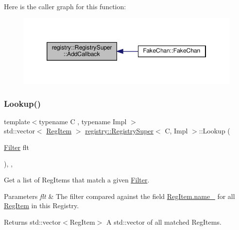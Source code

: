 Here is the caller graph for this function\+:
\nopagebreak
\begin{figure}[H]
\begin{center}
\leavevmode
\includegraphics[width=346pt]{classregistry_1_1RegistrySuper_a80e234502449509e0c9ce75e787ef974_icgraph}
\end{center}
\end{figure}
\mbox{\label{classregistry_1_1RegistrySuper_a83240eacc385688b32998c1e83d086c5}} 
\subsubsection{\texorpdfstring{Lookup()}{Lookup()}}
{\footnotesize\ttfamily template$<$typename C , typename Impl $>$ \\
std\+::vector$<$ \hyperlink{classregistry_1_1RegItem}{Reg\+Item} $>$ \hyperlink{classregistry_1_1RegistrySuper}{registry\+::\+Registry\+Super}$<$ C, Impl $>$\+::Lookup (\begin{DoxyParamCaption}\item[{\hyperlink{classregistry_1_1Filter}{Filter}}]{flt }\end{DoxyParamCaption})\hspace{0.3cm}{\ttfamily [override]}, {\ttfamily [virtual]}, {\ttfamily [noexcept]}}



Get a list of Reg\+Items that match a given \hyperlink{classregistry_1_1Filter}{Filter}. 


\begin{DoxyParams}{Parameters}
{\em flt} & The filter compared against the field \hyperlink{classregistry_1_1RegItem_a6e5945a427995b5f881403cd155b2a22}{Reg\+Item.\+name\+\_\+} for all \hyperlink{classregistry_1_1RegItem}{Reg\+Item} in this Registry. \\
\hline
\end{DoxyParams}
\begin{DoxyReturn}{Returns}
std\+::vector$<$\+Reg\+Item$>$ A std\+::vector of all matched Reg\+Items. 
\end{DoxyReturn}


